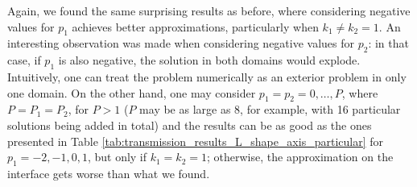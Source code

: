         




Again, we found the same surprising results as before, where considering negative values for \(p_1\) achieves better approximations, particularly when \(k_1 \neq k_2 = 1\). An interesting observation was made when considering negative values for \(p_2\): in that case, if \(p_1\) is also negative, the solution in both domains would explode. Intuitively, one can treat the problem numerically as an exterior problem in only one domain. On the other hand, one may consider \(p_1 = p_2 = 0, \dots, P\), where \(P=P_1=P_2\), for \(P > 1\) (\(P\) may be as large as 8, for example, with 16 particular solutions being added in total) and the results can be as good as the ones presented in Table \ref{tab:transmission_results_L_shape_axis_particular} for \(p_1=-2, -1, 0, 1\), but only if \(k_1=k_2=1\); otherwise, the approximation on the interface gets worse than what we found. 

